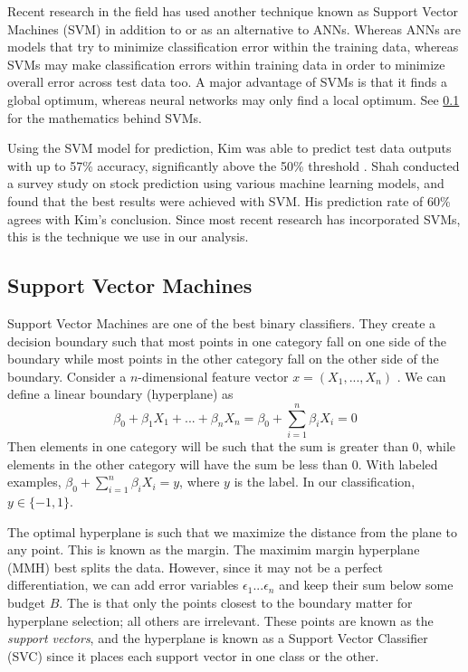 \documentclass[pageno]{jpaper}
\begin{document}
Recent research in the field has used another technique known as Support Vector Machines (SVM) in addition to or as an alternative to ANNs. Whereas ANNs are models that try to minimize classification error within the training data, whereas SVMs may make classification errors within training data in order to minimize overall error across test data too. A major advantage of SVMs is that it finds a global optimum, whereas neural networks may only find a local optimum. See \ref{subsec: svm} for the mathematics behind SVMs.

Using the SVM model for prediction, Kim was able to predict test data outputs with up to 57\% accuracy, significantly above the 50\% threshold \cite{kim}. Shah conducted a survey study on stock prediction using various machine learning models, and found that the best results were achieved with SVM\cite{shah}. His prediction rate of 60\% agrees with Kim's conclusion. Since most recent research has incorporated SVMs, this is the technique we use in our analysis.

\subsection{Support Vector Machines}
\label{subsec: svm}

Support Vector Machines are one of the best binary classifiers. They create a decision boundary such that most points in one category fall on one side of the boundary while most points in the other category fall on the other side of the boundary. Consider a $n$-dimensional feature vector $x = (X_1, ..., X_n)$ \cite{halls-moore}. We can define a linear boundary (hyperplane) as 
$$\beta_0+\beta_1X_1+...+\beta_nX_n=\beta_0+\sum_{i=1}^n\beta_iX_i = 0$$
Then elements in one category will be such that the sum is greater than 0, while elements in the other category will have the sum be less than 0. With labeled examples, $\beta_0+\sum_{i=1}^n\beta_iX_i = y$, where $y$ is the label. In our classification, $y \in \{-1, 1\}$.

The optimal hyperplane is such that we maximize the distance from the plane to any point. This is known as the margin. The maximim margin hyperplane (MMH) best splits the data. However, since it may not be a perfect differentiation, we can add error variables $\epsilon_1 ... \epsilon_n$ and keep their sum below some budget $B$. The  is that only the points closest to the boundary matter for hyperplane selection; all others are irrelevant. These points are known as the {\em support vectors}, and the hyperplane is known as a Support Vector Classifier (SVC) since it places each support vector in one class or the other.
\end{document}
